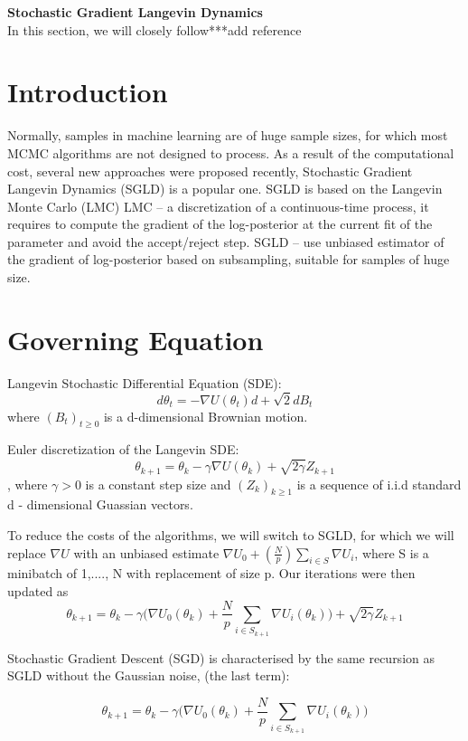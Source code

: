 \documentclass[a4paper]{article}
\begin{document}
\setlength{\droptitle}{-0.5in}


\normalsize
\textbf{Stochastic Gradient Langevin Dynamics}\\
In this section, we will closely follow***\Huge{add reference}
\scriptsize


\section{Introduction}

Normally, samples in machine learning are of huge sample sizes, for which most MCMC algorithms are not designed to process. 
As a result of the computational cost, several new approaches were proposed recently, Stochastic Gradient Langevin Dynamics (SGLD) is a popular one. 
SGLD is based on the Langevin Monte Carlo (LMC)
LMC – a discretization of a continuous-time process, it requires to compute the gradient of the log-posterior at the current fit of the parameter and avoid the accept/reject step.
SGLD – use unbiased estimator of the gradient of log-posterior based on subsampling, suitable for samples of huge size. 


\section{Governing Equation}

Langevin Stochastic Differential Equation (SDE):$$d\theta_t = -\nabla U(\theta_t)d +\sqrt{2}d B_t$$ where $(B_t)_{t \geq 0}$ is a d-dimensional Brownian motion. 

Euler discretization of the Langevin SDE:
$$\theta_{k+1} = \theta_k - \gamma \nabla U(\theta_k)+\sqrt{2\gamma} Z_{k+1}$$, where $\gamma > 0$ is a constant step size and $(Z_k)_{k\geq1}$ is a sequence of i.i.d standard d - dimensional Guassian vectors. 

To reduce the costs of the algorithms, we will switch to SGLD, for which we will replace $\nabla U$ with an unbiased estimate $\nabla U_0+(\frac{N}{p}) \sum_{i\in S}\nabla U_i$, where S is a minibatch of {1,...., N} with replacement of size p. Our iterations were then updated as
$$\theta_{k+1} = \theta_{k}-\gamma \Bigg (\nabla U_0(\theta_k)+\frac{N}{p}\sum_{i\in S_{k+1}}\nabla U_i(\theta_k)\Bigg )+\sqrt{2\gamma}Z_{k+1}$$

Stochastic Gradient Descent (SGD) is characterised by the same recursion as SGLD without the Gaussian noise, (the last term):


$$\theta_{k+1} = \theta_{k}-\gamma \Bigg (\nabla U_0(\theta_k)+\frac{N}{p}\sum_{i\in S_{k+1}}\nabla U_i(\theta_k)\Bigg)$$
\end{document}
